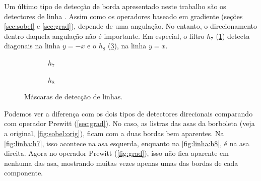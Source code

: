 Um último tipo de detecção de borda apresentado neste trabalho são os detectores de linha \autocite{ref:linedet}. Assim como os operadores baseado em gradiente (seções \ref{sec:sobel} e \ref{sec:grad}), depende de uma angulação. No entanto, o direcionamento dentro daquela angulação não é importante. Em especial, o filtro $h_7$ (\ref{fig:h7}) detecta diagonais na linha $y = -x$ e o $h_8$ (\ref{fig:h8}), na linha $y = x$.

\begin{figure}[H]
    \centering
    \begin{subfigure}{0.4\textwidth}
        \centering
        
        \caption{~$h_7$}
        \label{fig:h7}
    \end{subfigure}%
    \begin{subfigure}{0.4\textwidth}
        \centering
        
        \caption{~$h_8$}
        \label{fig:h8}
    \end{subfigure}

    \caption{Máscaras de detecção de linhas.}
\end{figure}

Podemos ver a diferença com os dois tipos de detectores direcionais comparando com operador Prewitt (\cref{sec:grad}). No caso, as listras das asas da borboleta (veja a original, \cref{fig:sobel:orig}), ficam com a duas bordas bem aparentes. Na \cref{fig:linha:h7}, isso acontece na asa esquerda, enquanto na \cref{fig:linha:h8}, é na asa direita. Agora no operador Prewitt (\cref{fig:grad}), isso não fica aparente em nenhuma das asa, mostrando muitas vezes apenas umas das bordas de cada componente.

